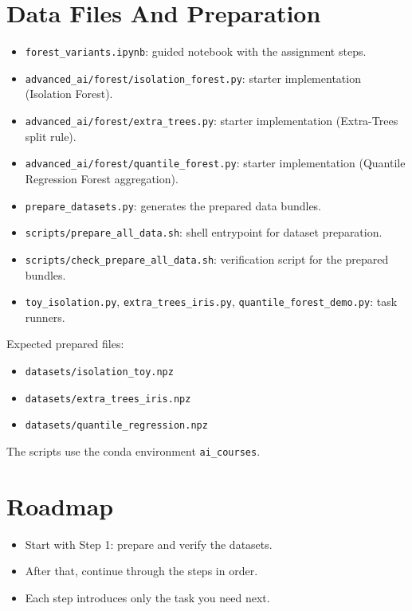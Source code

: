 \section*{Data Files And Preparation}
\begin{itemize}
  \item \texttt{forest\_variants.ipynb}: guided notebook with the assignment steps.
  \item \texttt{advanced\_ai/forest/isolation\_forest.py}: starter implementation (Isolation Forest).
  \item \texttt{advanced\_ai/forest/extra\_trees.py}: starter implementation (Extra-Trees split rule).
  \item \texttt{advanced\_ai/forest/quantile\_forest.py}: starter implementation (Quantile Regression Forest aggregation).
  \item \texttt{prepare\_datasets.py}: generates the prepared data bundles.
  \item \texttt{scripts/prepare\_all\_data.sh}: shell entrypoint for dataset preparation.
  \item \texttt{scripts/check\_prepare\_all\_data.sh}: verification script for the prepared bundles.
  \item \texttt{toy\_isolation.py}, \texttt{extra\_trees\_iris.py}, \texttt{quantile\_forest\_demo.py}: task runners.
\end{itemize}

\medskip
Expected prepared files:
\begin{itemize}
  \item \texttt{datasets/isolation\_toy.npz}
  \item \texttt{datasets/extra\_trees\_iris.npz}
  \item \texttt{datasets/quantile\_regression.npz}
\end{itemize}

\medskip
The scripts use the conda environment \texttt{ai\_courses}.

\section*{Roadmap}
\begin{itemize}
  \item Start with Step 1: prepare and verify the datasets.
  \item After that, continue through the steps in order.
  \item Each step introduces only the task you need next.
\end{itemize}

